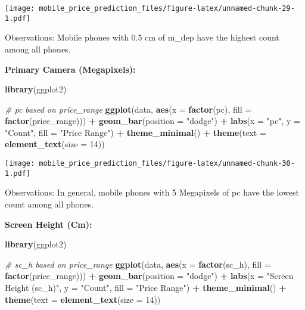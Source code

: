 \documentclass[
]{article}
\newenvironment{Shaded}{\begin{snugshade}}{\end{snugshade}}
\newcommand{\AttributeTok}[1]{\textcolor[rgb]{0.13,0.29,0.53}{#1}}
\newcommand{\CommentTok}[1]{\textcolor[rgb]{0.56,0.35,0.01}{\textit{#1}}}
\newcommand{\DecValTok}[1]{\textcolor[rgb]{0.00,0.00,0.81}{#1}}
\newcommand{\FunctionTok}[1]{\textcolor[rgb]{0.13,0.29,0.53}{\textbf{#1}}}
\newcommand{\NormalTok}[1]{#1}
\newcommand{\SpecialCharTok}[1]{\textcolor[rgb]{0.81,0.36,0.00}{\textbf{#1}}}
\newcommand{\StringTok}[1]{\textcolor[rgb]{0.31,0.60,0.02}{#1}}
\begin{document}
\texttt{[image: mobile\_price\_prediction\_files/figure-latex/unnamed-chunk-29-1.pdf]}

Observations: Mobile phones with 0.5 cm of m\_dep have the highest count
among all phones.

\textbf{Primary Camera (Megapixels):}

\begin{Shaded}
\begin{Highlighting}[]
\FunctionTok{library}\NormalTok{(ggplot2)}

\CommentTok{\# pc based on price\_range}
\FunctionTok{ggplot}\NormalTok{(data, }\FunctionTok{aes}\NormalTok{(}\AttributeTok{x =} \FunctionTok{factor}\NormalTok{(pc), }\AttributeTok{fill =} \FunctionTok{factor}\NormalTok{(price\_range))) }\SpecialCharTok{+}
  \FunctionTok{geom\_bar}\NormalTok{(}\AttributeTok{position =} \StringTok{"dodge"}\NormalTok{) }\SpecialCharTok{+}
  \FunctionTok{labs}\NormalTok{(}\AttributeTok{x =} \StringTok{"pc"}\NormalTok{, }\AttributeTok{y =} \StringTok{"Count"}\NormalTok{, }\AttributeTok{fill =} \StringTok{"Price Range"}\NormalTok{) }\SpecialCharTok{+}
  \FunctionTok{theme\_minimal}\NormalTok{() }\SpecialCharTok{+}
  \FunctionTok{theme}\NormalTok{(}\AttributeTok{text =} \FunctionTok{element\_text}\NormalTok{(}\AttributeTok{size =} \DecValTok{14}\NormalTok{))}
\end{Highlighting}
\end{Shaded}

\texttt{[image: mobile\_price\_prediction\_files/figure-latex/unnamed-chunk-30-1.pdf]}

Observations: In general, mobile phones with 5 Megapixels of pc have the
lowest count among all phones.

\textbf{Screen Height (Cm):}

\begin{Shaded}
\begin{Highlighting}[]
\FunctionTok{library}\NormalTok{(ggplot2)}

\CommentTok{\# sc\_h based on price\_range}
\FunctionTok{ggplot}\NormalTok{(data, }\FunctionTok{aes}\NormalTok{(}\AttributeTok{x =} \FunctionTok{factor}\NormalTok{(sc\_h), }\AttributeTok{fill =} \FunctionTok{factor}\NormalTok{(price\_range))) }\SpecialCharTok{+}
  \FunctionTok{geom\_bar}\NormalTok{(}\AttributeTok{position =} \StringTok{"dodge"}\NormalTok{) }\SpecialCharTok{+}
  \FunctionTok{labs}\NormalTok{(}\AttributeTok{x =} \StringTok{"Screen Height (sc\_h)"}\NormalTok{, }\AttributeTok{y =} \StringTok{"Count"}\NormalTok{, }\AttributeTok{fill =} \StringTok{"Price Range"}\NormalTok{) }\SpecialCharTok{+}
  \FunctionTok{theme\_minimal}\NormalTok{() }\SpecialCharTok{+}
  \FunctionTok{theme}\NormalTok{(}\AttributeTok{text =} \FunctionTok{element\_text}\NormalTok{(}\AttributeTok{size =} \DecValTok{14}\NormalTok{))}
\end{Highlighting}
\end{Shaded}
\end{document}
